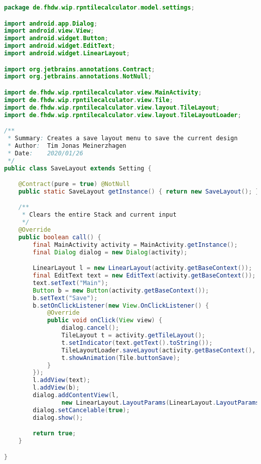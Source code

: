 \begin{lstlisting}[caption=SaveLayout (Meinerzhagen),label=list:SaveLayout,language=Java]
package de.fhdw.wip.rpntilecalculator.model.settings;

import android.app.Dialog;
import android.view.View;
import android.widget.Button;
import android.widget.EditText;
import android.widget.LinearLayout;

import org.jetbrains.annotations.Contract;
import org.jetbrains.annotations.NotNull;

import de.fhdw.wip.rpntilecalculator.view.MainActivity;
import de.fhdw.wip.rpntilecalculator.view.Tile;
import de.fhdw.wip.rpntilecalculator.view.layout.TileLayout;
import de.fhdw.wip.rpntilecalculator.view.layout.TileLayoutLoader;

/**
 * Summary: Creates a save layout menu to save the current design
 * Author:  Tim Jonas Meinerzhagen
 * Date:    2020/01/26
 */
public class SaveLayout extends Setting {

    @Contract(pure = true) @NotNull
    public static SaveLayout getInstance() { return new SaveLayout(); }

    /**
     * Clears the entire Stack and current input
     */
    @Override
    public boolean call() {
        final MainActivity activity = MainActivity.getInstance();
        final Dialog dialog = new Dialog(activity);

        LinearLayout l = new LinearLayout(activity.getBaseContext());
        final EditText text = new EditText(activity.getBaseContext());
        text.setText("Main");
        Button b = new Button(activity.getBaseContext());
        b.setText("Save");
        b.setOnClickListener(new View.OnClickListener() {
            @Override
            public void onClick(View view) {
                dialog.cancel();
                TileLayout t = activity.getTileLayout();
                t.setIndicator(text.getText().toString());
                TileLayoutLoader.saveLayout(activity.getBaseContext(), t);
                t.showAnimation(Tile.buttonSave);
            }
        });
        l.addView(text);
        l.addView(b);
        dialog.addContentView(l,
                new LinearLayout.LayoutParams(LinearLayout.LayoutParams.WRAP_CONTENT, LinearLayout.LayoutParams.WRAP_CONTENT));
        dialog.setCancelable(true);
        dialog.show();

        return true;
    }

}
\end{lstlisting}    

